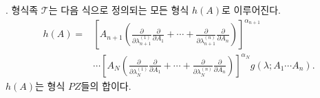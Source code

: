 
. 형식족 $\mathcal T$는 다음 식으로 정의되는 모든 형식 $h(A)$로 이루어진다.
\[
\begin{aligned}
 h(A)=&\left[A_{n+1}\left(
 \frac{\partial}{\partial\lambda_{n+1}^{(1)}}\frac{\partial}{\partial A_1}
 +\cdots+
 \frac{\partial}{\partial\lambda_{n+1}^{(n)}}\frac{\partial}{\partial A_n}\right)\right]^{\alpha_{n+1}} \\
&\cdots
\left[A_N\left(
 \frac{\partial}{\partial\lambda_N^{(1)}}\frac{\partial}{\partial A_1}
 +\cdots+
 \frac{\partial}{\partial\lambda_N^{(n)}}\frac{\partial}{\partial A_n}\right)\right]^{\alpha_N}
 g(\lambda;A_1\cdots A_n).
\end{aligned}
\]
$h(A)$는 형식 $PZ$들의 합이다.
